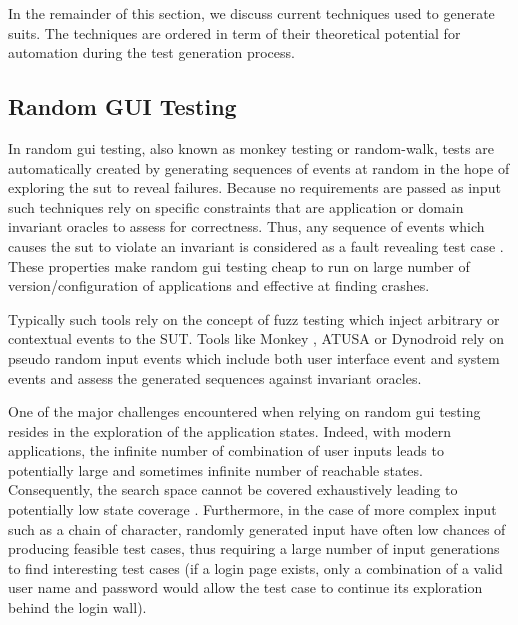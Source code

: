In the remainder of this section, we discuss current techniques used to generate \gls{suit}s. The techniques are ordered in term of their theoretical potential for automation during the test generation process.

\subsection{Random GUI Testing}
\label{sec:introduction-random-gui-testing}

In random \gls{gui} testing, also known as monkey testing or random-walk, tests are automatically created by generating sequences of events at random in the hope of exploring the \gls{sut} to reveal failures. Because no requirements are passed as input such techniques rely on specific constraints that are application or domain invariant oracles \cite{Mesbah2009} to assess for correctness. Thus, any sequence of events which causes the \gls{sut} to violate an invariant is considered as a fault revealing test case \cite{Barr2015}. These properties make random \gls{gui} testing cheap to run on large number of version/configuration of applications and effective at finding crashes.

Typically such tools rely on the concept of fuzz testing which inject arbitrary or contextual events to the SUT. Tools like Monkey \cite{Google2020},  ATUSA \cite{Mesbah2012} or Dynodroid \cite{Machiry2013} rely on pseudo random input events which include both user interface event and system events and assess the generated sequences against invariant oracles. 

One of the major challenges encountered when relying on random \gls{gui} testing resides in the exploration of the application states. Indeed, with modern applications, the infinite number of combination of user inputs leads to potentially large and sometimes infinite number of reachable states. Consequently, the search space cannot be covered exhaustively leading to potentially low state coverage \cite{Canny2019}. Furthermore, in the case of more complex input such as a chain of character, randomly generated input have often low chances of producing feasible test cases, thus requiring a large number of input generations to find interesting test cases (\eg if a login page exists, only a combination of a valid user name and password would allow the test case to continue its exploration behind the login wall).

